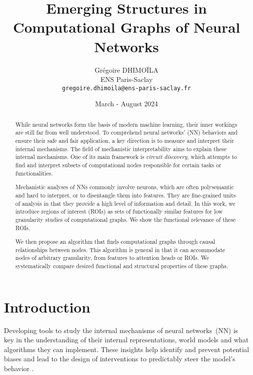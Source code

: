 \documentclass{article}
\begin{document}
\title{Emerging Structures in Computational Graphs of Neural Networks}
\author{
    Grégoire DHIMOÏLA \\
    ENS Paris-Saclay \\
    \texttt{gregoire.dhimoila@ens-paris-saclay.fr}
}
\date{March - August 2024}
\maketitle

\newpage
\begin{abstract}

While neural networks form the basis of modern machine learning, their inner workings are still far from well understood. To comprehend neural networks' (NN) behaviors and ensure their safe and fair application, a key direction is to measure and interpret their internal mechanisms. The field of mechanistic interpretability aims to explain these internal mechanisms. One of its main framework is \emph{circuit discovery}, which attempts to find and interpret subsets of computational nodes responsible for certain tasks or functionalities.

Mechanistic analyses of NNs commonly involve neurons, which are often polysemantic and hard to interpret, or to disentangle them into features. They are fine-grained units of analysis in that they provide a high level of information and detail. In this work, we introduce regions of interest (ROIs) as sets of functionally similar features for low granularity studies of computational graphs. We show the functional relevance of these ROIs.

We then propose an algorithm that finds computational graphs through causal relationships between nodes. This algorithm is general in that it can accommodate  nodes of arbitrary granularity, from features to attention heads or ROIs. We systematically compare desired functional and structural properties of these graphs.
\end{abstract}

\newpage
\tableofcontents

\newpage
\section{Introduction}

Developing tools to study the internal mechanisms of neural networks~(NN) is key in the understanding of their internal representations, world models and what algorithms they can implement. These insights help identify and prevent potential biases \citep{marks2024sparseCircuits} and lead to the design of interventions to predictably steer the model's behavior \citep{turner2024activationSteering,panickssery2024steeringllama2contrastive}.
\end{document}
